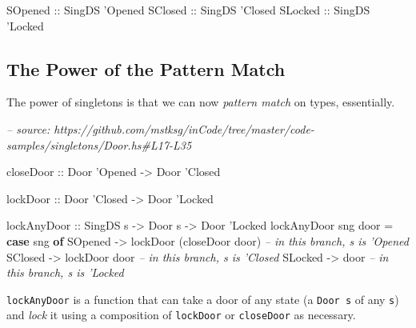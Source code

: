 \documentclass[]{article}
\newenvironment{Shaded}{}{}
\newcommand{\CommentTok}[1]{\textcolor[rgb]{0.38,0.63,0.69}{\textit{#1}}}
\newcommand{\DataTypeTok}[1]{\textcolor[rgb]{0.56,0.13,0.00}{#1}}
\newcommand{\FunctionTok}[1]{\textcolor[rgb]{0.02,0.16,0.49}{#1}}
\newcommand{\KeywordTok}[1]{\textcolor[rgb]{0.00,0.44,0.13}{\textbf{#1}}}
\newcommand{\NormalTok}[1]{#1}
\newcommand{\OtherTok}[1]{\textcolor[rgb]{0.00,0.44,0.13}{#1}}
\begin{document}
\begin{Shaded}
\begin{Highlighting}[]
\DataTypeTok{SOpened}\OtherTok{ ::} \DataTypeTok{SingDS}\NormalTok{ '}\DataTypeTok{Opened}
\DataTypeTok{SClosed}\OtherTok{ ::} \DataTypeTok{SingDS}\NormalTok{ '}\DataTypeTok{Closed}
\DataTypeTok{SLocked}\OtherTok{ ::} \DataTypeTok{SingDS}\NormalTok{ '}\DataTypeTok{Locked}
\end{Highlighting}
\end{Shaded}

\hypertarget{the-power-of-the-pattern-match}{%
\subsection{The Power of the Pattern
Match}\label{the-power-of-the-pattern-match}}

The power of singletons is that we can now \emph{pattern match} on types,
essentially.

\begin{Shaded}
\begin{Highlighting}[]
\CommentTok{-- source: https://github.com/mstksg/inCode/tree/master/code-samples/singletons/Door.hs#L17-L35}

\OtherTok{closeDoor ::} \DataTypeTok{Door}\NormalTok{ '}\DataTypeTok{Opened} \OtherTok{->} \DataTypeTok{Door}\NormalTok{ '}\DataTypeTok{Closed}

\OtherTok{lockDoor ::} \DataTypeTok{Door}\NormalTok{ '}\DataTypeTok{Closed} \OtherTok{->} \DataTypeTok{Door}\NormalTok{ '}\DataTypeTok{Locked}

\OtherTok{lockAnyDoor ::} \DataTypeTok{SingDS}\NormalTok{ s }\OtherTok{->} \DataTypeTok{Door}\NormalTok{ s }\OtherTok{->} \DataTypeTok{Door}\NormalTok{ '}\DataTypeTok{Locked}
\NormalTok{lockAnyDoor sng door }\FunctionTok{=} \KeywordTok{case}\NormalTok{ sng }\KeywordTok{of}
    \DataTypeTok{SOpened} \OtherTok{->}\NormalTok{ lockDoor (closeDoor door) }\CommentTok{-- in this branch, s is 'Opened}
    \DataTypeTok{SClosed} \OtherTok{->}\NormalTok{ lockDoor door             }\CommentTok{-- in this branch, s is 'Closed}
    \DataTypeTok{SLocked} \OtherTok{->}\NormalTok{ door                      }\CommentTok{-- in this branch, s is 'Locked}
\end{Highlighting}
\end{Shaded}

\texttt{lockAnyDoor} is a function that can take a door of any state (a
\texttt{Door\ s} of any \texttt{s}) and \emph{lock} it using a composition of
\texttt{lockDoor} or \texttt{closeDoor} as necessary.
\end{document}
